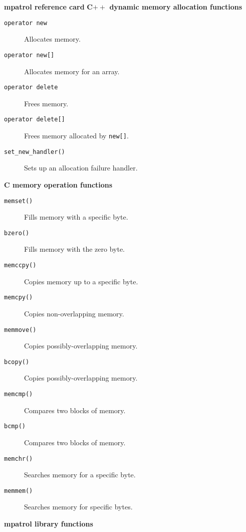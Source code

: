 \documentclass[a4paper,landscape,final]{article}
\newcommand{\heading}[1]{\textbf{\normalsize #1}}
\newcommand{\function}[1]{\texttt{#1()}}
\begin{document}
\begin{multicols}{3}{\textbf{\Large mpatrol reference card}}
\vskip 12pt
\heading{C$++$ dynamic memory allocation functions}
\vskip 6pt

\begin{description}
\item[\texttt{operator new}]
\hfill Allocates memory.
\item[\texttt{operator new[]}]
\hfill Allocates memory for an array.
\item[\texttt{operator delete}]
\hfill Frees memory.
\item[\texttt{operator delete[]}]
\hfill Frees memory allocated by \texttt{new[]}.
\item[\function{set\_new\_handler}]
\hfill Sets up an allocation failure handler.
\end{description}

\vskip 12pt
\heading{C memory operation functions}
\vskip 6pt

\begin{description}
\item[\function{memset}]
\hfill Fills memory with a specific byte.
\item[\function{bzero}]
\hfill Fills memory with the zero byte.
\item[\function{memccpy}]
\hfill Copies memory up to a specific byte.
\item[\function{memcpy}]
\hfill Copies non-overlapping memory.
\item[\function{memmove}]
\hfill Copies possibly-overlapping memory.
\item[\function{bcopy}]
\hfill Copies possibly-overlapping memory.
\item[\function{memcmp}]
\hfill Compares two blocks of memory.
\item[\function{bcmp}]
\hfill Compares two blocks of memory.
\item[\function{memchr}]
\hfill Searches memory for a specific byte.
\item[\function{memmem}]
\hfill Searches memory for specific bytes.
\end{description}

\vskip 12pt
\heading{mpatrol library functions}
\vskip 6pt


\end{multicols}
\end{document}
